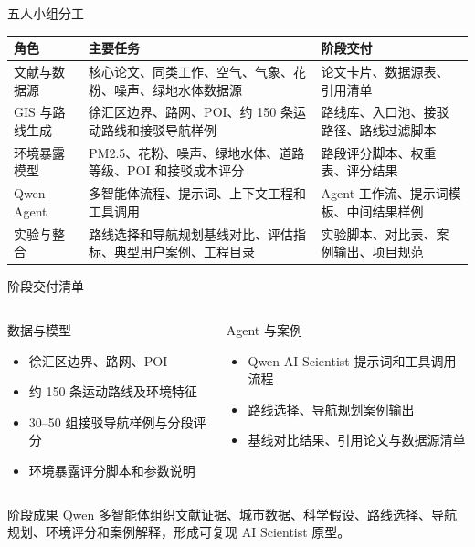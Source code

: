 \documentclass[xcolor=table,dvipsnames,svgnames,aspectratio=169]{ctexbeamer}
\newcommand{\smallitem}{\setlength{\itemsep}{0.25em}}
\begin{document}
\begin{frame}{五人小组分工}
  \scriptsize
  \begin{tabularx}{\textwidth}{p{}p{}Y}
    \toprule
    角色 & 主要任务 & 阶段交付 \\
    \midrule
    文献与数据源 & 核心论文、同类工作、空气、气象、花粉、噪声、绿地水体数据源 & 论文卡片、数据源表、引用清单 \\
    GIS 与路线生成 & 徐汇区边界、路网、POI、约 150 条运动路线和接驳导航样例 & 路线库、入口池、接驳路径、路线过滤脚本 \\
    环境暴露模型 & PM2.5、花粉、噪声、绿地水体、道路等级、POI 和接驳成本评分 & 路段评分脚本、权重表、评分结果 \\
    Qwen Agent & 多智能体流程、提示词、上下文工程和工具调用 & Agent 工作流、提示词模板、中间结果样例 \\
    实验与整合 & 路线选择和导航规划基线对比、评估指标、典型用户案例、工程目录 & 实验脚本、对比表、案例输出、项目规范 \\
    \bottomrule
  \end{tabularx}
\end{frame}

\begin{frame}{阶段交付清单}
  \scriptsize
  \begin{columns}[T]
    \begin{block}{数据与模型}
      \begin{itemize}
        \smallitem
        \item 徐汇区边界、路网、POI
        \item 约 150 条运动路线及环境特征
        \item 30--50 组接驳导航样例与分段评分
        \item 环境暴露评分脚本和参数说明
      \end{itemize}
    \end{block}

    \begin{block}{Agent 与案例}
      \begin{itemize}
        \smallitem
        \item Qwen AI Scientist 提示词和工具调用流程
        \item 路线选择、导航规划案例输出
        \item 基线对比结果、引用论文与数据源清单
      \end{itemize}
    \end{block}
  \end{columns}

  \vspace{0.3em}
  \begin{exampleblock}{阶段成果}
    Qwen 多智能体组织文献证据、城市数据、科学假设、路线选择、导航规划、环境评分和案例解释，形成可复现 AI Scientist 原型。
  \end{exampleblock}
\end{frame}

\makebottom
\end{document}
